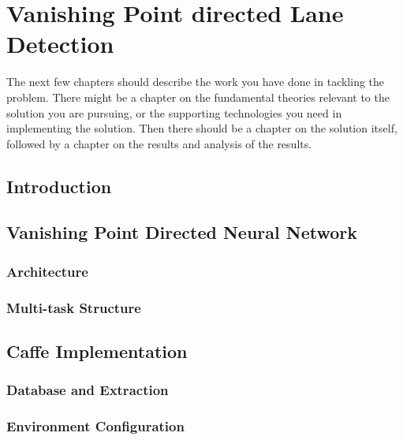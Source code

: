 
\chapter{Vanishing Point directed Lane Detection}
\begin{spacing}{1.5}
\setlength{\parskip}{0.3in}

The next few chapters should describe the work you have done in tackling the problem. There might be a chapter on the fundamental theories relevant to the solution you are pursuing, or the supporting technologies you need in implementing the solution. Then there should be a chapter on the solution itself, followed by a chapter on the results and analysis of the results.

\section{Introduction}



\section{Vanishing Point Directed Neural Network}

\subsection{Architecture}

\subsection{Multi-task Structure}


\section{Caffe Implementation}

\subsection{Database and Extraction}

\subsection{Environment Configuration}


\end{spacing}

